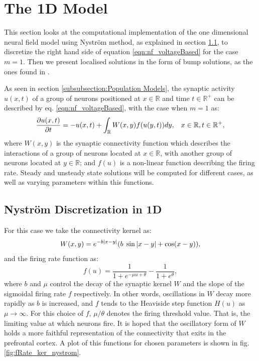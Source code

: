 \documentclass{uonmathreport}
\begin{document}
\section{The 1D Model}\label{sec:1d_model}
This section looks at the computational implementation of the one dimensional neural field model using Nystr\"om method, as explained in section \ref{subsec:1d_nystrom}, to discretize the right hand side of equation \ref{eqn:nf_voltageBased} for the case $m=1$. Then we present localised solutions in the form of bump solutions, as the ones found in \cite{LaingCarloR.2002MBia}.

As seen in section \ref{subsubsection:Population Models}, the synaptic activity $u(x,t)$ of a group of neurons positioned at $x \in \mathbb{R}$ and time $t \in \mathbb{R}^+$ can be described by eq. \ref{eqn:nf_voltageBased}, with the case when $m = 1$ as: 
\begin{equation}\label{eqn:nf_1dmodel}
\frac{\partial u(x,t)}{\partial t} = - u(x,t) + \int_{\mathbb{R}} W(x,y)f(u(y, t)) dy, \hspace{3mm} x \in \mathbb{R},t \in \mathbb{R}^+,
\end{equation}
where $W(x,y)$ is the synaptic connectivity function which describes the interactions of a group of neurons located at $x \in \mathbb{R}$, with another group of neurons located at $y \in \mathbb{R}$; and $f(u)$ is a non-linear function describing the firing rate. Steady and unsteady state solutions will be computed for different cases, as well as varying parameters within this functions.

\subsection{Nystr\"om Discretization in 1D}\label{subsec:1d_nystrom}
For this case we take the connectivity kernel as:
\begin{equation}\label{eqn:1d_kernel}
W(x,y)  = e^{-b|x-y|}(b\hspace{1mm} \sin|x-y| + \cos(x-y)),
\end{equation}
and the firing rate function as:
\begin{equation}\label{eqn:1d_firing_rate}
f(u) = \frac{1}{1+e^{-\mu u + \theta}} -\frac{1}{1+e^\theta},
\end{equation}
where $b$ and $\mu$ control the decay of the synaptic kernel $W$ and the slope of the sigmoidal firing rate $f$ respectively. In other words, oscillations in $W$ decay more rapidly as $b$ is increased, and $f$ tends to the Heaviside step function $H(u)$ as $\mu \rightarrow \infty$. For this choice of $f$, $\mu / \theta$ denotes the firing threshold value. That is, the limiting value at which neurons fire. It is hoped that the oscillatory form of $W$ holds a more faithful representation of the connectivity that exits in the prefrontal cortex. A plot of this functions for chosen parameters is shown in fig.\ref{fig:fRate_ker_nystrom}.
\end{document}
